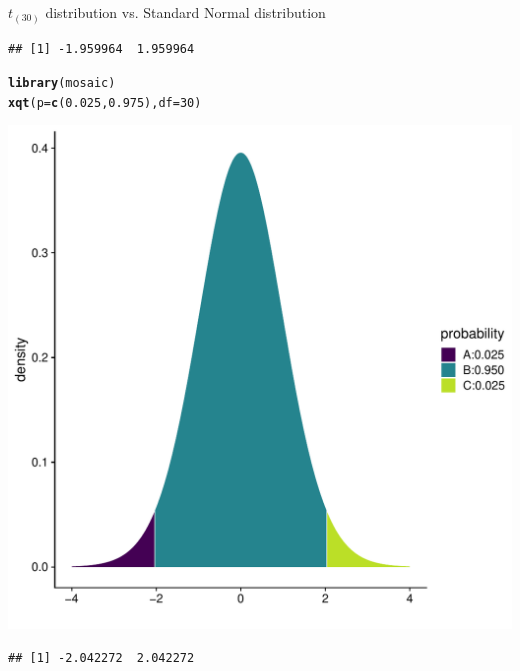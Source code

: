 \documentclass[10pt]{beamer}\usepackage[]{graphicx}\usepackage[]{color}
\makeatletter
\def\maxwidth{ %
  \ifdim\Gin@nat@width>\linewidth
    \linewidth
  \else
    \Gin@nat@width
  \fi
}
\newcommand{\hlnum}[1]{\textcolor[rgb]{0.686,0.059,0.569}{#1}}%
\newcommand{\hlstd}[1]{\textcolor[rgb]{0.345,0.345,0.345}{#1}}%
\newcommand{\hlkwc}[1]{\textcolor[rgb]{0.333,0.667,0.333}{#1}}%
\newcommand{\hlkwd}[1]{\textcolor[rgb]{0.737,0.353,0.396}{\textbf{#1}}}%
\newenvironment{kframe}{%
 \def\at@end@of@kframe{}%
 \ifinner\ifhmode%
  \def\at@end@of@kframe{\end{minipage}}%
  \begin{minipage}{\columnwidth}%
 \fi\fi%
 \def\FrameCommand##1{\hskip\@totalleftmargin \hskip-\fboxsep
 \colorbox{shadecolor}{##1}\hskip-\fboxsep
     \hskip-\linewidth \hskip-\@totalleftmargin \hskip\columnwidth}%
 \MakeFramed {\advance\hsize-\width
   \@totalleftmargin\z@ \linewidth\hsize
   \@setminipage}}%
 {\par\unskip\endMakeFramed%
 \at@end@of@kframe}
\newenvironment{knitrout}{}{} %
\makeatother
\begin{document}
\begin{frame}[fragile]{$t_{(30)}$ distribution vs. Standard Normal distribution}
\begin{minipage}{0.47\textwidth}
\begin{knitrout}
\begin{kframe}\begin{verbatim}
## [1] -1.959964  1.959964
\end{verbatim}
\end{kframe}
\end{knitrout}
	\end{minipage}
	\begin{minipage}{0.5\textwidth}
\begin{knitrout}\tiny
{}\color{fgcolor}\begin{kframe}
\begin{alltt}
\hlkwd{library}\hlstd{(mosaic)}
\hlkwd{xqt}\hlstd{(}\hlkwc{p} \hlstd{=} \hlkwd{c}\hlstd{(}\hlnum{0.025}\hlstd{,} \hlnum{0.975}\hlstd{),} \hlkwc{df} \hlstd{=} \hlnum{30}\hlstd{)}
\end{alltt}
\end{kframe}
\end{knitrout}
\begin{knitrout}\tiny
{}\color{fgcolor}

{\centering \includegraphics[width=\maxwidth]{figure/unnamed-chunk-8-1} 

}


\begin{kframe}\begin{verbatim}
## [1] -2.042272  2.042272
\end{verbatim}
\end{kframe}
\end{knitrout}
	\end{minipage}
\end{frame}
\end{document}
